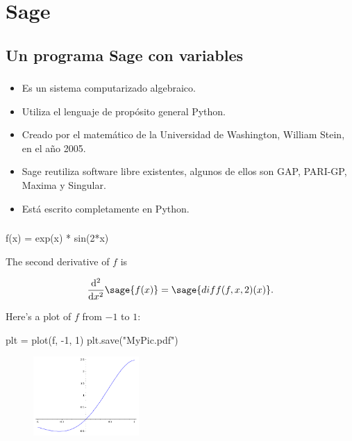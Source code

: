 \section{Sage}
\subsection{Un programa Sage con variables}

\begin{frame}
\frametitle{\insertsection}
\begin{block}{\insertsubsection}
\begin{itemize}
\item Es un sistema computarizado algebraico.
\item Utiliza el lenguaje de propósito general Python.
\item Creado por el matemático de la Universidad de Washington, William Stein, en el año 2005.
\item Sage reutiliza software libre existentes, algunos de ellos son GAP, PARI-GP, Maxima y Singular.
\item Está escrito completamente en Python.
\end{itemize}
\end{block}
\end{frame}

\begin{frame}[fragile]
\frametitle{\insertsection}
\begin{block}{\insertsubsection}
\begin{sageblock}
f(x) = exp(x) * sin(2*x)
\end{sageblock}
The second derivative of $f$ is

\[
\frac{\mathrm{d}^{2}}{\mathrm{d}x^{2}} \sage{f(x)} =
\sage{diff(f, x, 2)(x)}.
\]

Here's a plot of $f$ from $-1$ to $1$:
\end{block}

\begin{sagesilent}
plt  = plot(f, -1, 1)
plt.save("MyPic.pdf")
\end{sagesilent}

\begin{figure}
\centering
\includegraphics[height=3cm]{MyPic.pdf}
\end{figure}

\end{frame}

